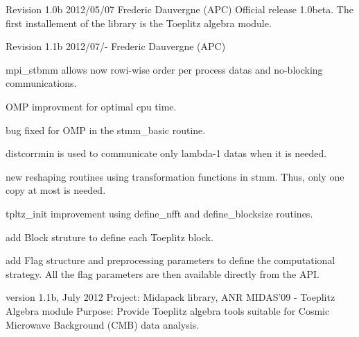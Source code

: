 Revision 1.\-0b 2012/05/07 Frederic Dauvergne (A\-P\-C) Official release 1.\-0beta. The first installement of the library is the Toeplitz algebra module.

Revision 1.\-1b 2012/07/-\/ Frederic Dauvergne (A\-P\-C)
\begin{DoxyItemize}
\item mpi\-\_\-stbmm allows now rowi-\/wise order per process datas and no-\/blocking communications.
\item O\-M\-P improvment for optimal cpu time.
\item bug fixed for O\-M\-P in the stmm\-\_\-basic routine.
\item distcorrmin is used to communicate only lambda-\/1 datas when it is needed.
\item new reshaping routines using transformation functions in stmm. Thus, only one copy at most is needed.
\item tpltz\-\_\-init improvement using define\-\_\-nfft and define\-\_\-blocksize routines.
\item add Block struture to define each Toeplitz block.
\item add Flag structure and preprocessing parameters to define the computational strategy. All the flag parameters are then available directly from the A\-P\-I.
\end{DoxyItemize}

version 1.\-1b, July 2012 Project\-: Midapack library, A\-N\-R M\-I\-D\-A\-S'09 -\/ Toeplitz Algebra module Purpose\-: Provide Toeplitz algebra tools suitable for Cosmic Microwave Background (C\-M\-B) data analysis.

